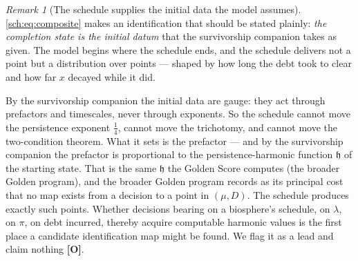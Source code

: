 \documentclass[11pt]{article}
\newcommand{\hm}{\mathfrak{h}}
\theoremstyle{plain}
\theoremstyle{definition}
\theoremstyle{remark}
\newtheorem{remark}[theorem]{Remark}
\begin{document}
\begin{remark}[The schedule supplies the initial data the model assumes]
\label{sch:rem:initialdata}
\eqref{sch:eq:composite} makes an identification that should be stated plainly:
\emph{the completion state is the initial datum} that
the survivorship companion \cite{SurvA} takes as given. The model begins where the
schedule ends, and the schedule delivers not a point but a distribution
over points --- shaped by how long the debt took to clear and how far
$x$ decayed while it did.

By the survivorship companion \cite{SurvA} the initial data are gauge: they act
through prefactors and timescales, never through exponents. So the
schedule cannot move the persistence exponent $\tfrac14$, cannot move
the trichotomy, and cannot move the two-condition theorem. What it sets
is the prefactor --- and by the survivorship companion \cite{SurvA} the prefactor
is proportional to the persistence-harmonic function $\hm$ of the
starting state. That is the same $\hm$ the Golden Score computes
(the broader Golden program), and the broader Golden program records as
its principal cost that no map exists from a decision to a point in
$(\mu,D)$. The schedule produces exactly such points. Whether decisions
bearing on a biosphere's schedule, on $\lambda$, on $\pi$, on debt
incurred, thereby acquire computable harmonic values is the first
place a candidate identification map might be found. We flag it as a
lead and claim nothing \textbf{[O]}.
\end{remark}
\end{document}
